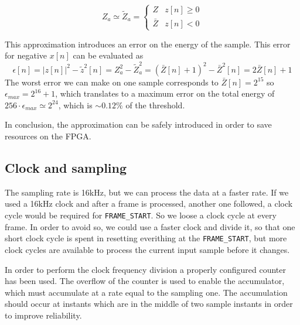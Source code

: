 \begin{equation}
  Z_a \simeq \widetilde{Z}_a = \begin{cases}
    Z & z[n] \ge 0 \\
    \bar{Z} & z[n] < 0
  \end{cases}
\end{equation}

This approximation introduces an error on the energy of the sample.
This error for negative $x[n]$ can be evaluated as
\begin{equation}
  \epsilon[n] = |z[n]|^2 - \tilde{z}^2[n] = Z_a^2 - \widetilde{Z}_a^2 = (\bar{Z}[n] + 1)^2 - \bar{Z}^2[n] = 2\bar{Z}[n] + 1
\end{equation}
The worst error we can make on one sample corresponds to $\bar{Z}[n] = 2^{15}$
so $\epsilon_{max} = 2^{16}+1$, which translates to a maximum error on the total
energy of $256 \cdot \epsilon_{max} \simeq 2^{24}$, which is $\sim 0.12\%$ of the
threshold.

In conclusion, the approximation can be safely introduced in order to save
resources on the FPGA.

\subsection{Clock and sampling}
The sampling rate is 16\si{\kilo\hertz}, but we can process the data at a faster
rate. If we used a 16\si{\kilo\hertz} clock and after a frame is processed,
another one followed, a clock cycle would be required for \texttt{FRAME\_START}.
So we loose a clock cycle at every frame. In order to avoid so, we could use a
faster clock and divide it, so that one short clock cycle is spent in resetting
everithing at the \texttt{FRAME\_START}, but more clock cycles are
available to process the current input sample before it changes.

In order to perform the clock frequency division a properly configured counter
has been used. The overflow of the counter is used to enable the accumulator,
which must accumulate at a rate equal to the sampling one.
The accumulation should occur at instants which are in the middle of two sample
instants in order to improve reliability.
